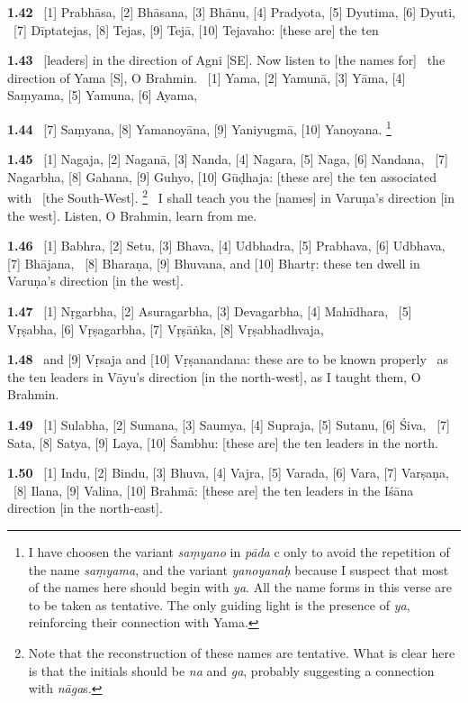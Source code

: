 \documentclass{article}
\newcommand{\skt}[1]{\textit{#1}}
\begin{document}
\textbf{1.42}%
\ [1] Prabhāsa, [2] Bhāsana, [3] Bhānu, [4] Pradyota, [5] Dyutima, [6] Dyuti,%
\ [7] Dīptatejas, [8] Tejas, [9] Tejā, [10] Tejavaho: [these are] the ten%


\textbf{1.43}%
\ [leaders] in the direction of Agni [SE]. Now listen to [the names for]%
\                 the direction of Yama [S], O Brahmin.%
\ [1] Yama, [2] Yamunā, [3] Yāma, [4] Saṃyama, [5] Yamuna, [6] Ayama,%


\textbf{1.44}%
\ [7] Saṃyana, [8] Yamanoyāna, [9] Yaniyugmā, [10] Yanoyana.%
\footnote{I have choosen the variant \skt{saṃyano} in \skt{pāda} c only to avoid the repetition of                        the name \skt{saṃyama}, and the variant \skt{yanoyanaḥ} because I suspect that                        most of the names here should begin with \skt{ya}. All the name forms                        in this verse are to be taken as tentative. The only                         guiding light is the presence of \skt{ya}, reinforcing their connection with Yama. }%


\textbf{1.45}%
\ [1] Nagaja, [2] Naganā, [3] Nanda, [4] Nagara, [5] Naga, [6] Nandana,%
\                 [7] Nagarbha, [8] Gahana, [9] Guhyo, [10] Gūḍhaja: [these are] the ten associated with%
\                         [the South-West].%
\footnote{Note that the reconstruction of these names are tentative. What is clear here is that the                initials should be \skt{na} and \skt{ga}, probably suggesting a connection with \skt{nāga}s. }%
\ I shall teach you the [names] in Varuṇa's direction [in the west]. Listen, O Brahmin, learn from me.%


\textbf{1.46}%
\ [1] Babhra, [2] Setu, [3] Bhava, [4] Udbhadra, [5] Prabhava, [6] Udbhava, [7] Bhājana,%
\ [8] Bharaṇa, [9] Bhuvana, and [10] Bhartṛ: these ten dwell in Varuṇa's direction [in the west].%


\textbf{1.47}%
\ [1] Nṛgarbha, [2] Asuragarbha, [3] Devagarbha, [4] Mahīdhara,%
\ [5] Vṛṣabha, [6] Vṛṣagarbha, [7] Vṛṣāṅka, [8] Vṛṣabhadhvaja,%


\textbf{1.48}%
\ and [9] Vṛsaja and [10] Vṛṣanandana: these are to be known properly%
\ as the ten leaders in Vāyu's direction [in the north-west], as I taught them, O Brahmin.%


\textbf{1.49}%
\ [1] Sulabha, [2] Sumana, [3] Saumya, [4] Supraja, [5] Sutanu, [6] Śiva,%
\ [7] Sata, [8] Satya, [9] Laya, [10] Śambhu: [these are] the ten leaders in the north.%


\textbf{1.50}%
\ [1] Indu, [2] Bindu, [3] Bhuva, [4] Vajra, [5] Varada, [6] Vara, [7] Varṣaṇa,%
\ [8] Ilana, [9] Valina, [10] Brahmā: [these are] the ten leaders in the Iśāna direction [in the north-east].%
\end{document}
